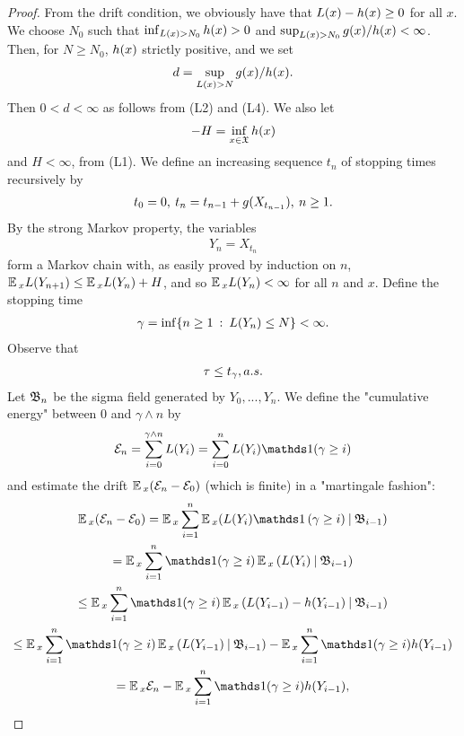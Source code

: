 	\begin{proof}
		From the drift condition, we obviously have that $L(x) - h(x) \geq 0$ for all $x$. We choose $N_{0}$ such that $\inf_{L(x) > N_{0}}h(x) > 0$ and $\sup_{L(x) > N_{0}}g(x)/h(x) < \infty$. Then, for $N \geq N_{0}$, $h(x)$ strictly positive, and we set
		\begin{gather*}
		d = \sup_{L(x) > N}g(x)/h(x).
		\end{gather*}
		Then $0 < d < \infty$ as follows from (L2) and (L4). We also let
		\begin{gather*}
		-H = \inf_{x \in \mathfrak{X}}h(x)
		\end{gather*}
		and $H < \infty$, from (L1). We define an increasing sequence $t_{n}$ of stopping times recursively by
		\begin{gather*}
		t_{0} = 0, \: t_{n} = t_{n-1} + g(X_{t_{n-1}}), \: n \geq 1.
		\end{gather*}
		By the strong Markov property, the variables
		\begin{gather*}
		Y_{n} = X_{t_{n}}
		\end{gather*}
		form a Markov chain with, as easily proved by induction on $n$, $\operatorname*{\mathbb{E}}{}_{x}L(Y_{n+1}) \leq \operatorname*{\mathbb{E}}{}_{x}L(Y_{n}) + H$, and so $\operatorname*{\mathbb{E}}{}_{x}L(Y_{n}) < \infty$ for all $n$ and $x$. Define the stopping time
		\begin{gather*}
		\gamma = \inf\{n \geq 1 \: : \: L(Y_{n}) \leq N\} < \infty.
		\end{gather*}
		Observe that
		\begin{gather*}
		\tau \leq t_{\gamma}, a.s.
		\end{gather*}
		Let $\mathfrak{B}_{n}$ be the sigma field generated by $Y_{0},..., Y_{n}$. We define the "cumulative energy"$ $ between 0 and $\gamma \wedge n$ by
		\begin{gather*}
		\cefVar_{n} = \sum_{i=0}^{\gamma \wedge n}\ltfVar(Y_{i}) = \sum_{i=0}^{n}\ltfVar(Y_{i})\indicator(\gamma \geq i)
		\end{gather*}
		and estimate the drift $\operatorname*{\mathbb{E}}{}_{x}(\mathcal{E}_{n} - \mathcal{E}_{0})$ (which is finite) in a "martingale fashion":
		\begin{gather*}
		\E{}_{x}(\cefVar_{n} - \cefVar_{0}) = \E{}_{x}\sum_{i=1}^{n}\E{}_{x}(\ltfVar(Y_{i})\indicator\left(\gamma \geq i) \: | \: \asaVar_{i-1}\right) \\= \E{}_{x}\sum_{i=1}^{n}\indicator(\gamma \geq i)\E{}_{x}\left(\ltfVar(Y_{i}) \: | \: \asaVar_{i-1}\right) \\ \leq \E{}_{x}\sum_{i=1}^{n}\indicator(\gamma \geq i)\E{}_{x}\left(\ltfVar(Y_{i-1}) - \hffVar(Y_{i-1}) \: | \: \asaVar_{i-1}\right) \\ \leq \E{}_{x}\sum_{i=1}^{n}\indicator(\gamma \geq i)\E{}_{x}\left(\ltfVar(Y_{i-1}) \: | \: \asaVar_{i-1}\right) -\E{}_{x}\sum_{i=1}^{n}\indicator(\gamma \geq i)\hffVar(Y_{i-1}) \\ = \E{}_{x}\cefVar_{n} - \E{}_{x}\sum_{i=1}^{n}\indicator(\gamma \geq i)\hffVar(Y_{i-1}),

\end{gather*}
\end{proof}
